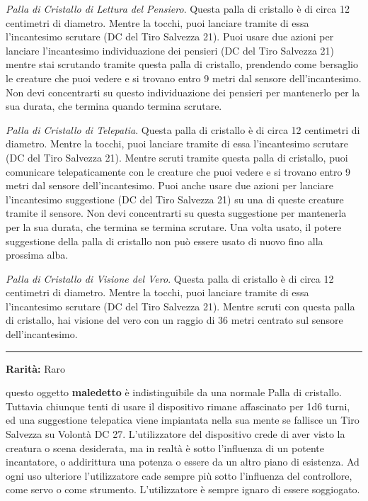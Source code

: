 \begin{multicols}{2}
\emph{Palla di Cristallo di Lettura del Pensiero}. Questa palla di cristallo è di circa 12 centimetri di diametro. Mentre la tocchi, puoi lanciare tramite di essa l'incantesimo scrutare (DC del Tiro Salvezza 21). Puoi usare due azioni per lanciare l'incantesimo individuazione dei pensieri (DC del Tiro Salvezza 21) mentre stai scrutando tramite questa palla di cristallo, prendendo come bersaglio le creature che puoi vedere e si trovano entro 9 metri dal sensore dell'incantesimo. Non devi concentrarti su questo individuazione dei pensieri per mantenerlo per la sua durata, che termina quando termina scrutare.

\emph{Palla di Cristallo di Telepatia}. Questa palla di cristallo è di circa 12 centimetri di diametro. Mentre la tocchi, puoi lanciare tramite di essa l'incantesimo scrutare (DC del Tiro Salvezza 21). Mentre scruti tramite questa palla di cristallo, puoi comunicare telepaticamente con le creature che puoi vedere e si trovano entro 9 metri dal sensore dell'incantesimo. Puoi anche usare due azioni per lanciare l'incantesimo suggestione (DC del Tiro Salvezza 21) su una di queste creature tramite il sensore. Non devi concentrarti su questa suggestione per mantenerla per la sua durata, che termina se termina scrutare. Una volta usato, il potere suggestione della palla di cristallo non può essere usato di nuovo fino alla prossima alba.

\emph{Palla di Cristallo di Visione del Vero}. Questa palla di cristallo è di circa 12 centimetri di diametro. Mentre la tocchi, puoi lanciare tramite di essa l'incantesimo scrutare (DC del Tiro Salvezza 21). Mentre scruti con questa palla di cristallo, hai visione del vero con un raggio di 36 metri centrato sul sensore dell'incantesimo.

\smallskip\noindent\rule{\linewidth}{2pt}  \hypertarget{PalladiCristalloipnotica}{}\smallskip{}\noindent\label{PalladiCristalloipnotica}

\textbf{Rarità:} Raro

questo oggetto \textbf{maledetto} è indistinguibile da una normale Palla di cristallo. Tuttavia chiunque tenti di usare il dispositivo rimane affascinato per 1d6 turni, ed una suggestione telepatica viene impiantata nella sua mente se fallisce un Tiro Salvezza su Volontà DC 27. L'utilizzatore del dispositivo crede di aver visto la creatura o scena desiderata, ma in realtà è sotto l'influenza di un potente incantatore, o addirittura una potenza o essere da un altro piano di esistenza. Ad ogni uso ulteriore l'utilizzatore cade sempre più sotto l'influenza del controllore, come servo o come strumento. L'utilizzatore è sempre ignaro di essere soggiogato.


\end{multicols}
